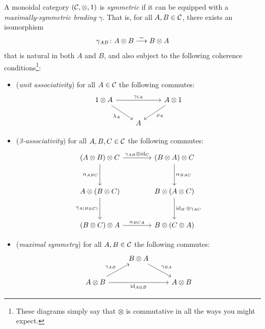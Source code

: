         \begin{definition}\label{df:smc}
            A monoidal category $(\mathcal{C},\otimes,1)$ is \emph{symmetric} if it can be equipped with a \emph{maximally-symmetric brading $\gamma$}.
            That is, for all $A,B\in\mathcal{C}$, there exists an isomorphism
            \begin{equation*}
                \gamma_{AB}\colon A\otimes B\overset{\sim}{\longrightarrow} B\otimes A
            \end{equation*}
            that is natural in both $A$ and $B$, and also subject to the following coherence conditions\footnote{
                These diagrams simply say that $\otimes$ is commutative in all the ways you might expect.
            }:
            \begin{itemize}
                \item (\emph{unit associativity}) for all $A\in\mathcal{C}$ the following commutes:
                    \begin{equation*}
                        \begin{tikzcd}
                            1\otimes A \arrow[rr, "\gamma_{1A}"] \arrow[dr, swap, "\lambda_A"] & & A\otimes 1 \arrow[dl, "\rho_A"]\\
                             & A &
                        \end{tikzcd}
                    \end{equation*}
                \item (\emph{3-associativity}) for all $A,B,C\in\mathcal{C}$ the following commutes:
                    \begin{equation*}
                        \begin{tikzcd}[column sep=4em,row sep=3em]
                            (A\otimes B)\otimes C \arrow[r, "\gamma_{AB}\otimes\id_C"] \arrow[d, swap, "\alpha_{ABC}"] & (B\otimes A)\otimes C \arrow[d, "\alpha_{BAC}"]\\
                            A\otimes(B\otimes C) \arrow[d, swap, "\gamma_{A(B\otimes C)}"] & B\otimes(A\otimes C) \arrow[d, "\id_B\otimes\gamma_{AC}"]\\
                            (B\otimes C)\otimes A \arrow[r, "\alpha_{BCA}"] & B\otimes(C\otimes A)
                        \end{tikzcd}
                    \end{equation*}
                \item (\emph{maximal symmetry}) for all $A,B\in\mathcal{C}$ the following commutes:
                    \begin{equation*}
                        \begin{tikzcd}
                             & B\otimes A \arrow[dr, "\gamma_{BA}"] & \\
                            A\otimes B \arrow[ur, "\gamma_{AB}"] \arrow[rr, swap, "\id_{A\otimes B}"] & & A\otimes B
                        \end{tikzcd}
                    \end{equation*}\qedhere
            \end{itemize}
        \end{definition}

